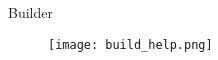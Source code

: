 \begin{frame}{Builder}
    \begin{figure}
        \texttt{[image: build\_help.png]}
    \end{figure}
\end{frame}

